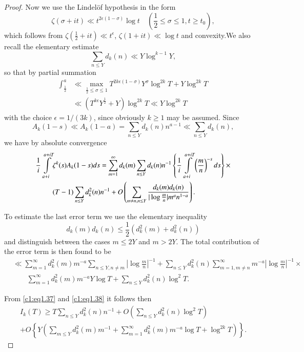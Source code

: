 \begin{proof}
Now we use the Lindel\"of hypothesis in the form
$$
\zeta (\sigma + it) \ll t^{2 \epsilon (1- \sigma)} \log t \quad
\left(\frac{1}{2} \leq \sigma \leq 1, t \geq t_0\right),
$$
which follows from $\zeta \left(\frac{1}{2} + it \right) \ll
t^\epsilon$, $\zeta (1+ it)\ll \log t$ and convexity.\pageoriginale We
also recall the elementary estimate
$$
\sum\limits_{n \leq Y} d_k (n) \ll Y \log^{k-1}Y,
$$
so that by partial summation
\begin{align*}
  \int_{\frac{1}{2}}^a & \ll \mathop{\max}_{\frac{1}{2} \leq \sigma
    \leq 1} T^{2 k\epsilon (1 - \sigma)} Y^\sigma \log^{2k} T+ Y
  \log^{2k}T\\
  & \ll (T^{k \epsilon} Y^{\frac{1}{2}} + Y) \log^{2k}T \ll Y \log^{2k}T
\end{align*}
with the choice $\epsilon =1/(3k)$, since obviously $k \geq 1$ may be
assumed. Since 
$$
A_k (1-s) \ll A_k (1-a) = \sum_{n \leq Y} d_k (n) n^{a-1} \ll \sum_{n \leq Y} d_k (n), 
$$
we have by absolute convergence
\begin{align}
  \frac{1}{i} \int\limits_{a+i}^{a+ iT} & \zeta^k (s) A_k (1-s)ds =
  \sum_{m=1}^\infty d_k (m) \sum_{n \leq Y} d_k (n) n^{-1}
  \left\{\frac{1}{i} \int\limits^{a+ iT}_{a+i} \left(\frac{m}{n}
  \right)^{-s} ds\right\}\times\notag\\
  & (T-1) \sum_{n \leq Y} d^2_k (n) n^{-1} + O \left( \sum_{m \neq n,
    n \leq Y} \frac{d_k (m) d_k (n)}{|\log \frac{m}{n}| m^a
    n^{1-a}}\right). \label{c1:eq1.38}
\end{align}

To estimate the last error term we use the elementary inequality
$$
d_k (m) d_k (n) \leq \frac{1}{2} (d_k^2 (m) + d_k^2 (n))
$$
and distinguish between the cases $m\leq 2Y$ and $m > 2Y$. The total
contribution of the error term is then found to be
\begin{align*}
  & \ll \sum^\infty_{m=1} d_k^2 (m) m^{-a} \sum_{n \leq Y, n \neq m}
  \left|\log \frac{m}{n}\right|^{-1}+ \sum_{n \leq Y} d_k^2 (n) \sum_{m=1, m\neq
    n}^\infty m^{-a} \left|\log \frac{m}{n}\right|^{-1}\times\\
  &\qquad \sum^\infty_{m=1} d_k^2 (m) m^{-a} Y \log T + \sum_{n \leq Y}
  d_k^2 (n) \log^2 T.
\end{align*}

From \eqref{c1:eq1.37} and \eqref{c1:eq1.38} it follows then 
\begin{multline*}
  I_k (T) \geq T \sum_{n \leq Y} d_k^2 (n) n^{-1} + O \left(\sum_{n
    \leq Y} d_k^2 (n) \log^2 T \right)\\
  + O \left\{Y \left( \sum_{m \leq Y} d_k^2 (m) m^{-1}+ \sum^\infty_{m=1}
  d_k^2 (m) m^{-a} \log T + \log^{2k} T \right)\right\}.
\end{multline*}


\end{proof}
